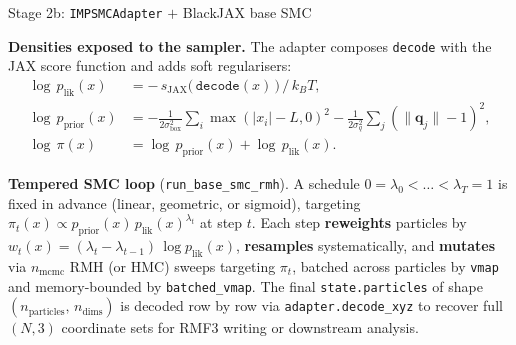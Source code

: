 \documentclass[10pt,aspectratio=169]{beamer}
\begin{document}
\begin{frame}[fragile]{Stage 2b: \texttt{IMPSMCAdapter} \(+\) BlackJAX base SMC}

\textbf{Densities exposed to the sampler.}
The adapter composes \texttt{decode} with the JAX score function and
adds soft regularisers:
\begin{align*}
    \log\,p_\text{lik}(x)   &= -\,s_\text{JAX}\bigl(\,\texttt{decode}(x)\,\bigr)\,/\,k_BT, \\
    \log\,p_\text{prior}(x) &= -\tfrac{1}{2\sigma_\text{box}^2}\!\!\sum_i \!\max(|x_i| - L, 0)^2
                              -\tfrac{1}{2\sigma_q^2}\!\!\sum_j(\|\mathbf{q}_j\|-1)^2, \\
    \log\,\pi(x)            &= \log\,p_\text{prior}(x) + \log\,p_\text{lik}(x).
\end{align*}

\textbf{Tempered SMC loop} (\texttt{run\_base\_smc\_rmh}).
A schedule \(0 = \lambda_0 < \dots < \lambda_T = 1\) is fixed in advance
(linear, geometric, or sigmoid), targeting
\(\pi_t(x) \propto p_\text{prior}(x)\,p_\text{lik}(x)^{\lambda_t}\) at
step \(t\). Each step \textbf{reweights} particles by
\(w_t(x) = (\lambda_t - \lambda_{t-1})\,\log p_\text{lik}(x)\),
\textbf{resamples} systematically, and \textbf{mutates} via
\(n_\text{mcmc}\) RMH (or HMC) sweeps targeting \(\pi_t\), batched across
particles by \texttt{vmap} and memory-bounded by \texttt{batched\_vmap}.
The final \texttt{state.particles} of shape
\((n_\text{particles},\, n_\text{dims})\) is decoded row by row via
\texttt{adapter.decode\_xyz} to recover full \((N,3)\) coordinate sets
for RMF3 writing or downstream analysis.

\end{frame}
\end{document}
